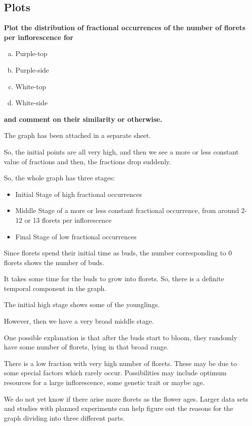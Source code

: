 \documentclass[twocolumn]{article}
\begin{document}
\subsection{Plots} 

\textbf{Plot the distribution of fractional occurrences of the number of florets per inflorescence for}
\begin{enumerate}[a)]
    \item Purple-top
    \item Purple-side 
    \item White-top 
    \item White-side
\end{enumerate}
\textbf{and comment on their similarity or otherwise.}

The graph has been attached in a separate sheet.

So, the initial points are all very high, and then we see a more or less constant value of fractions and then, the fractions drop suddenly.


So, the whole graph has three stages:
\begin{itemize}
    \item Initial Stage of high fractional occurrences
    \item Middle Stage of a more or less constant fractional occurrence, from around 2-12 or 13 florets per inflorescence
    \item Final Stage of low fractional occurrences
\end{itemize}

Since florets spend their initial time as buds, the number corresponding to 0 florets shows the number of buds. 

It takes some time for the buds to grow into florets. So, there is a definite temporal component in the graph. 

The initial high stage shows some of the younglings. 

However, then we have a very broad middle stage. 

One possible explanation is that after the buds start to bloom, they randomly have some number of florets, lying in that broad range.

There is a low fraction with very high number of florets. These may be due to some special factors which rarely occur. Possibilities may include optimum resources for a large inflorescence, some genetic trait or maybe age. 

We do not yet know if there arise more florets as the flower ages. Larger data sets and studies with planned experiments can help figure out the reasons for the graph dividing into three different parts.
\end{document}
